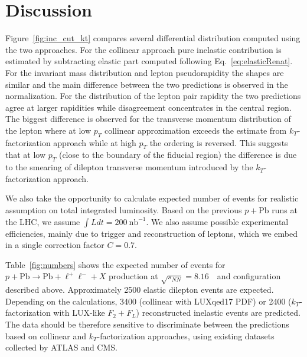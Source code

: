 \clearpage
\section{Discussion}
\label{sec:discussion}

Figure~\ref{fig:inc_cut_kt} compares several differential distribution computed using the two approaches. For the collinear approach pure inelastic contribution is estimated by
subtracting elastic part computed following Eq.~\ref{eq:elasticRenat}.
For the invariant mass distribution and lepton pseudorapidity the shapes are similar and
the main difference between the two predictions is observed in the normalization.
For the distribution of the lepton pair rapidity the two predictions agree at larger rapidities while disagreement concentrates
in the central region. The biggest difference is observed for the transverse momentum distribution of the lepton where at low $p_T$ collinear approximation exceeds the estimate
from $k_T$-factorization approach while at high $p_T$ the ordering is reversed.  
This suggests that at low $p_T$ (close to the boundary of the fiducial region) the difference is due to the smearing of dilepton transverse momentum introduced by the $k_T$-factorization approach.

We also take the opportunity to calculate expected number of events for realistic assumption on total integrated luminosity.
Based on the previous $p+\textrm{Pb}$ runs at the LHC, we assume  $\int Ldt= 200~\textrm{nb}^{-1}$.
We also assume possible experimental efficiencies, mainly due to trigger and reconstruction of leptons, which we embed in a single correction factor $C=0.7$.

Table~\ref{fig:numbers} shows the expected number of events for $p+\textrm{Pb}\rightarrow \textrm{Pb} + \ell^+\ell^- + X$ production at $\sqrt{s_{N N}} = 8.16$~\TeV\ and configuration described above. 
Approximately 2500 elastic dilepton events are expected. 
Depending on the calculations, 3400 (collinear with LUXqed17 PDF) or 2400 ($k_T$-factorization with LUX-like $F_2+F_L$) reconstructed inelastic events are predicted. 
The data should be therefore sensitive to discriminate between the predictions based on  
collinear and $k_T$-factorization approaches, using existing datasets collected by ATLAS and CMS.



